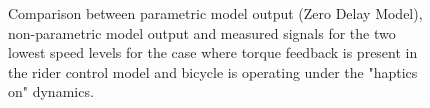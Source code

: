 \begin{figure}[!h]
    \centering
    \begin{subfigure}[b]{\textwidth}
        \centering
        \caption{}
        \label{fig:zdm_fit1}
    \end{subfigure}
    \begin{subfigure}[b]{\textwidth}
        \centering
        \caption{}
        \label{fig:zdm_fit2}
    \end{subfigure}
    
    \caption{Comparison between parametric model output (Zero Delay Model), non-parametric model output and measured signals for the two lowest speed levels for the case where torque feedback is present in the rider control model and bicycle is operating under the "haptics on" dynamics.}
    \label{fig:zdm_fitA}
 \end{figure}

